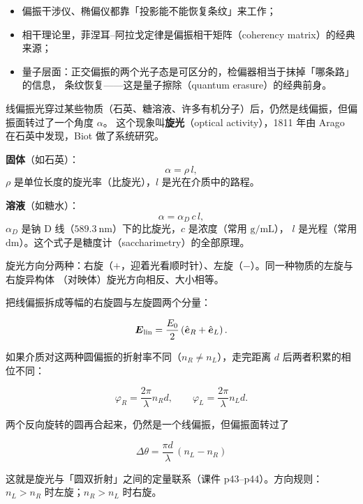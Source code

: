 \documentclass[11pt]{ctexart}
\let\subhdrtheme\subhdr
\renewcommand{\subhdr}[1]{\needspace{4\baselineskip}\subhdrtheme{#1}}
\let\hdrorig\hdr
\renewcommand{\hdr}[2]{\needspace{11\baselineskip}\hdrorig{#1}{#2}}
\begin{document}
\begin{itemize}[leftmargin=1.6em]
\item 偏振干涉仪、椭偏仪都靠「投影能不能恢复条纹」来工作；
\item 相干理论里，菲涅耳--阿拉戈定律是偏振相干矩阵（coherency matrix）的经典来源；
\item 量子层面：正交偏振的两个光子态是可区分的，检偏器相当于抹掉「哪条路」的信息，
条纹恢复——这是量子擦除（quantum erasure）的经典前身。
\end{itemize}



线偏振光穿过某些物质（石英、糖溶液、许多有机分子）后，仍然是线偏振，但偏振面转过了一个角度 $\alpha$。
这个现象叫\textbf{旋光}（optical activity），1811 年由 Arago 在石英中发现，Biot 做了系统研究。

\textbf{固体}（如石英）：
\[
\alpha=\rho\,l,
\]
$\rho$ 是单位长度的旋光率（比旋光），$l$ 是光在介质中的路程。

\textbf{溶液}（如糖水）：
\[
\alpha=\alpha_D\,c\,l,
\]
$\alpha_D$ 是钠 D 线（$589.3\ \mathrm{nm}$）下的比旋光，$c$ 是浓度（常用 $\mathrm{g/mL}$），
$l$ 是光程（常用 $\mathrm{dm}$）。这个式子是糖度计（saccharimetry）的全部原理。

旋光方向分两种：右旋（$+$，迎着光看顺时针）、左旋（$-$）。同一种物质的左旋与右旋异构体
（对映体）旋光方向相反、大小相等。


把线偏振拆成等幅的右旋圆与左旋圆两个分量：

\[
\boldsymbol{E}_{\text{lin}}=\frac{E_0}{2}\left(\hat{\boldsymbol{e}}_R+\hat{\boldsymbol{e}}_L\right).
\]

如果介质对这两种圆偏振的折射率不同（$n_R\neq n_L$），走完距离 $d$ 后两者积累的相位不同：

\[
\varphi_R=\frac{2\pi}{\lambda}n_Rd,\qquad
\varphi_L=\frac{2\pi}{\lambda}n_Ld .
\]

两个反向旋转的圆再合起来，仍然是一个线偏振，但偏振面转过了

\[
\boxed{\ \Delta\theta=\frac{\pi d}{\lambda}\,(n_L-n_R)\ }
\]

这就是旋光与「圆双折射」之间的定量联系（课件 p43--p44）。方向规则：
$n_L>n_R$ 时左旋；$n_R>n_L$ 时右旋。

\end{document}
